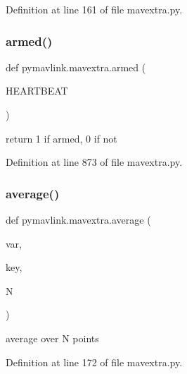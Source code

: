 Definition at line 161 of file mavextra.\+py.

\mbox{\label{namespacepymavlink_1_1mavextra_a00f2c88d67afcae53f725e0d8105adb1}} 
\subsubsection{\texorpdfstring{armed()}{armed()}}
{\footnotesize\ttfamily def pymavlink.\+mavextra.\+armed (\begin{DoxyParamCaption}\item[{}]{H\+E\+A\+R\+T\+B\+E\+AT }\end{DoxyParamCaption})}

\begin{DoxyVerb}return 1 if armed, 0 if not\end{DoxyVerb}
 

Definition at line 873 of file mavextra.\+py.

\mbox{\label{namespacepymavlink_1_1mavextra_a3953775074e771143256576a19fab8d3}} 
\subsubsection{\texorpdfstring{average()}{average()}}
{\footnotesize\ttfamily def pymavlink.\+mavextra.\+average (\begin{DoxyParamCaption}\item[{}]{var,  }\item[{}]{key,  }\item[{}]{N }\end{DoxyParamCaption})}

\begin{DoxyVerb}average over N points\end{DoxyVerb}
 

Definition at line 172 of file mavextra.\+py.

\mbox{\label{namespacepymavlink_1_1mavextra_a602868624e22e520d6376334c46aed97}} 
